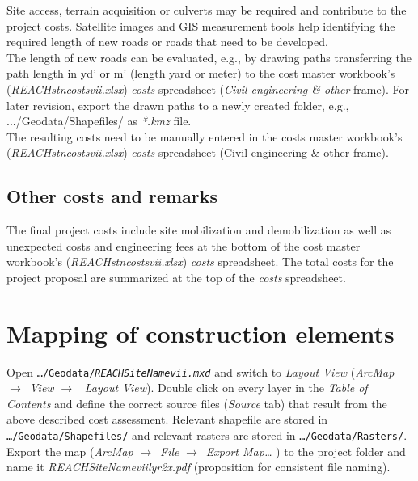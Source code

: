 Site access, terrain acquisition or culverts may be required and contribute to the project costs. Satellite images and GIS measurement tools help identifying the required length of new roads or roads that need to be developed.\\ 
The length of new roads can be evaluated, e.g., by drawing paths transferring the path length in yd' or m' (length yard or meter) to the cost master workbook's (\emph{REACH{\myUnderscore}stn{\myUnderscore}costs{\myUnderscore}vii.xlsx}) \emph{costs} spreadsheet (\emph{Civil engineering \& other} frame). For later revision, export the drawn paths to a newly created folder, e.g., .../Geodata/Shapefiles/ as \emph{*.kmz} file.\\
The resulting costs need to be manually entered in the costs master workbook's (\emph{REACH{\myUnderscore}stn{\myUnderscore}costs{\myUnderscore}vii.xlsx}) \emph{costs} spreadsheet (Civil engineering $\&$ other frame).

\subsection{Other costs and remarks}

The final project costs include site mobilization and demobilization as well as unexpected costs and engineering fees at the bottom of the cost master workbook's (\emph{REACH{\myUnderscore}stn{\myUnderscore}costs{\myUnderscore}vii.xlsx}) \emph{costs} spreadsheet. The total costs for the project proposal are summarized at the top of the \emph{costs} spreadsheet.

\section{Mapping of construction elements}\label{sec:pmmaps}

Open \texttt{\ldots{}/Geodata/\emph{REACH}{\myUnderscore}\emph{SiteName}{\myUnderscore}\emph{vii.mxd}} and switch to \emph{Layout View} (\emph{ArcMap} $\rightarrow$~\emph{View} $\rightarrow$~ \emph{Layout View}). Double click on every layer in the \emph{Table of Contents} and define the correct source files (\emph{Source} tab) that result from the above described cost assessment. Relevant shapefile are stored in \texttt{\ldots{}/Geodata/Shapefiles/} and relevant rasters are stored in \texttt{\ldots{}/Geodata/Rasters/}. Export the map (\emph{ArcMap} $\rightarrow$~\emph{File} $\rightarrow$~\emph{Export Map\ldots{}} ) to the project folder and name it \emph{REACH{\myUnderscore}SiteName{\myUnderscore}vii{\myUnderscore}lyr2x.pdf} (proposition for consistent file naming).


